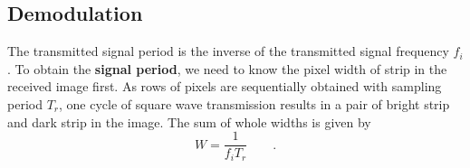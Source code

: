 \subsection{Demodulation}
\label{sec:demodulation}
The transmitted signal period is the inverse of the transmitted signal frequency $f_i$. 
To obtain the \textbf{signal period}, we need to know the pixel width of strip in the received image first. 
As rows of pixels are sequentially obtained with sampling period $T_r$, one cycle of square wave transmission results in a pair of bright strip and dark strip in the image. 
The sum of whole widths is given by
\begin{equation}
W= \frac{1}{f_i T_r} \qquad \textrm{.}
\label{eq:widthtofreq}
\end{equation}


